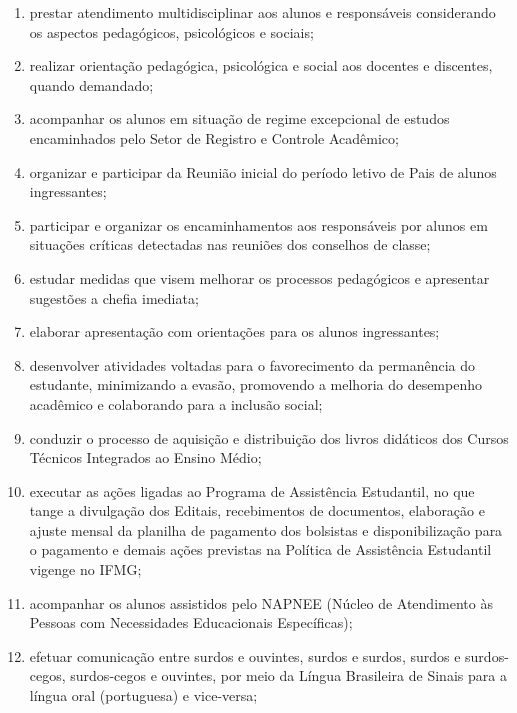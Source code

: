 \documentclass[a4paper,12pt]{report}
\begin{document}
\begin{enumerate}
\item prestar atendimento multidisciplinar aos alunos e responsáveis considerando os 
      aspectos pedagógicos, psicológicos e sociais;

\item realizar orientação pedagógica, psicológica e social aos docentes e discentes, quando       demandado;

\item acompanhar os alunos em situação de regime excepcional de estudos encaminhados pelo 
      Setor de Registro e Controle Acadêmico;

\item organizar e participar da Reunião inicial do período letivo de Pais de alunos 
      ingressantes;

\item participar e organizar os encaminhamentos aos responsáveis por alunos em situações 
      críticas detectadas nas reuniões dos conselhos de classe;

\item estudar medidas que visem melhorar os processos pedagógicos e apresentar sugestões a 
      chefia imediata;

\item elaborar apresentação com orientações para os alunos ingressantes;

\item desenvolver atividades voltadas para o favorecimento da permanência do estudante, 
      minimizando a evasão, promovendo a melhoria do desempenho acadêmico e colaborando para a inclusão social;

\item conduzir o processo de aquisição e distribuição dos livros didáticos dos Cursos 
      Técnicos Integrados ao Ensino Médio;

\item executar as ações ligadas ao Programa de Assistência Estudantil, no que tange a 
      divulgação dos  Editais, recebimentos de documentos, elaboração e ajuste mensal da planilha de pagamento dos bolsistas e disponibilização para o pagamento e demais ações previstas na Política de Assistência Estudantil vigenge no IFMG;

\item acompanhar os alunos assistidos pelo NAPNEE (Núcleo de Atendimento às Pessoas com 
      Necessidades Educacionais Específicas);

\item efetuar comunicação entre surdos e ouvintes, surdos e surdos, surdos e surdos-cegos, 
      surdos-cegos e ouvintes, por meio da Língua Brasileira de Sinais para a língua oral (portuguesa) e vice-versa;
      

\end{enumerate}
\end{document}

